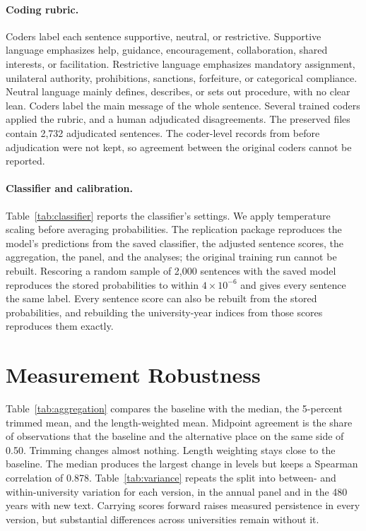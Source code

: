 \documentclass[11pt]{article}
\begin{document}
\paragraph{Coding rubric.} Coders label each sentence supportive, neutral, or restrictive. Supportive language emphasizes help, guidance, encouragement, collaboration, shared interests, or facilitation. Restrictive language emphasizes mandatory assignment, unilateral authority, prohibitions, sanctions, forfeiture, or categorical compliance. Neutral language mainly defines, describes, or sets out procedure, with no clear lean. Coders label the main message of the whole sentence. Several trained coders applied the rubric, and a human adjudicated disagreements. The preserved files contain 2,732 adjudicated sentences. The coder-level records from before adjudication were not kept, so agreement between the original coders cannot be reported.

\paragraph{Classifier and calibration.} Table~\ref{tab:classifier} reports the classifier's settings. We apply temperature scaling before averaging probabilities. The replication package reproduces the model's predictions from the saved classifier, the adjusted sentence scores, the aggregation, the panel, and the analyses; the original training run cannot be rebuilt. Rescoring a random sample of 2,000 sentences with the saved model reproduces the stored probabilities to within $4\times10^{-6}$ and gives every sentence the same label. Every sentence score can also be rebuilt from the stored probabilities, and rebuilding the university-year indices from those scores reproduces them exactly.



\section{Measurement Robustness}\label{app:robust}
\setcounter{table}{0}

Table~\ref{tab:aggregation} compares the baseline with the median, the 5-percent trimmed mean, and the length-weighted mean. Midpoint agreement is the share of observations that the baseline and the alternative place on the same side of 0.50. Trimming changes almost nothing. Length weighting stays close to the baseline. The median produces the largest change in levels but keeps a Spearman correlation of 0.878. Table~\ref{tab:variance} repeats the split into between- and within-university variation for each version, in the annual panel and in the 480 years with new text. Carrying scores forward raises measured persistence in every version, but substantial differences across universities remain without it.
\end{document}
